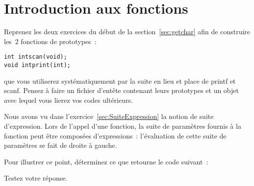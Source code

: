 \section{Introduction aux fonctions}
\label{sec:Fonction}
\begin{exercice}
  Reprenez les deux exercices du d\'ebut de la
  section~\ref{sec:getchar} afin de construire les~$2$ fonctions de
  prototypes~:
\begin{verbatim}
int intscan(void);
void intprint(int);
\end{verbatim}
  que vous utiliserez syst\'ematiquement par la suite en lieu et place
  de printf et scanf. Pensez \`a faire un fichier d'ent\^ete contenant
  leurs prototypes et un objet avec lequel vous lierez vos codes
  ult\'erieurs.
\end{exercice}
\begin{exercice}
  Nous avons vu dans l'exercice~\ref{sec:SuiteExpression} la notion de
  suite d'expression.  Lors de l'appel d'une fonction, la suite de
  param\`etres fournis \`a la fonction peut \^etre compos\'ees
  d'expressions~: l'\'evaluation de cette suite de param\`etres se
  fait de droite \`a gauche.
  \par
  Pour illustrer ce point, d\'eterminez ce que retourne le code suivant~:
  
  Testez votre r\'eponse.
\end{exercice}
